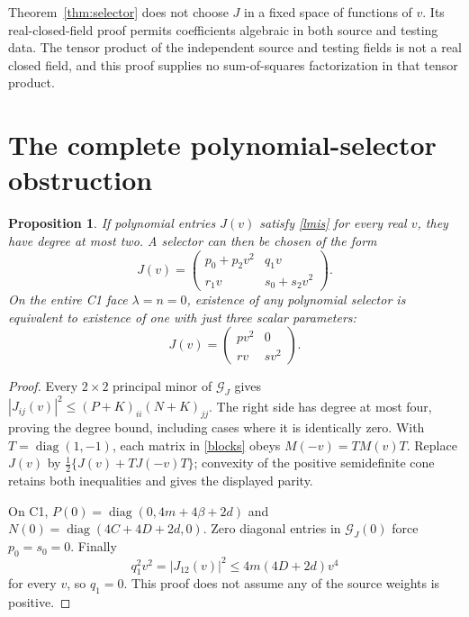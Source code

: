 \documentclass[11pt]{article}
\newtheorem{proposition}[theorem]{Proposition}
\begin{document}
Theorem~\ref{thm:selector} does not choose $J$ in a fixed space of functions
of $v$. Its real-closed-field proof permits coefficients algebraic in both
source and testing data. The tensor product of the independent source and
testing fields is not a real closed field, and this proof supplies no
sum-of-squares factorization in that tensor product.

\section{The complete polynomial-selector obstruction}
\begin{proposition}\label{prop:degree}
If polynomial entries $J(v)$ satisfy \eqref{lmis} for every real $v$, they have
degree at most two.  A selector can then be chosen of the form
\[
J(v)=\begin{pmatrix}p_0+p_2v^2&q_1v\\r_1v&s_0+s_2v^2\end{pmatrix}.
\]
On the entire C1 face $\lambda=n=0$, existence of any polynomial selector is
equivalent to existence of one with just three scalar parameters:
\begin{equation}
\boxed{J(v)=\begin{pmatrix}pv^2&0\\rv&sv^2\end{pmatrix}.}\label{three}
\end{equation}
\end{proposition}
\begin{proof}
Every $2\times2$ principal minor of $\mathcal G_J$ gives
$|J_{ij}(v)|^2\leq(P+K)_{ii}(N+K)_{jj}$.  The right side has degree at most
four, proving the degree bound, including cases where it is identically zero.
With $T=\operatorname{diag}(1,-1)$, each matrix in \eqref{blocks} obeys
$M(-v)=TM(v)T$.  Replace $J(v)$ by
$\tfrac12\{J(v)+TJ(-v)T\}$; convexity of the positive semidefinite cone retains
both inequalities and gives the displayed parity.

On C1, $P(0)=\operatorname{diag}(0,4m+4\beta+2d)$ and
$N(0)=\operatorname{diag}(4C+4D+2d,0)$.  Zero diagonal entries in
$\mathcal G_J(0)$ force $p_0=s_0=0$. Finally
\[
q_1^2v^2=|J_{12}(v)|^2\leq4m(4D+2d)v^4
\]
for every $v$, so $q_1=0$. This proof does not assume any of the source weights
is positive.
\end{proof}
\end{document}
